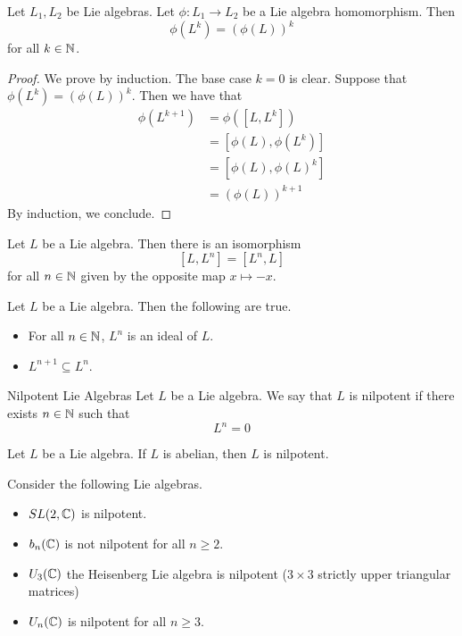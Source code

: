 \documentclass[a4paper]{article}
\begin{document}
\begin{lmm}{}{} Let $L_1,L_2$ be Lie algebras. Let $\phi:L_1\to L_2$ be a Lie algebra homomorphism. Then $$\phi(L^k)=(\phi(L))^k$$ for all $k\in\mathbb{N}$. \tcbline
\begin{proof}
We prove by induction. The base case $k=0$ is clear. Suppose that $\phi(L^k)=(\phi(L))^k$. Then we have that 
\begin{align*}
\phi(L^{k+1})&=\phi([L,L^k])\\
&=[\phi(L),\phi(L^k)]\\
&=[\phi(L),\phi(L)^k]\\
&=(\phi(L))^{k+1}
\end{align*}
By induction, we conclude. 
\end{proof}
\end{lmm}

\begin{lmm}{}{} Let $L$ be a Lie algebra. Then there is an isomorphism $$[L,L^n]=[L^n,L]$$ for all $n\in\mathbb{N}$ given by the opposite map $x\mapsto-x$. 
\end{lmm}

\begin{lmm}{}{} Let $L$ be a Lie algebra. Then the following are true. 
\begin{itemize}
\item For all $n\in\mathbb{N}$, $L^n$ is an ideal of $L$. 
\item $L^{n+1}\subseteq L^n$. 
\end{itemize}
\end{lmm}

\begin{defn}{Nilpotent Lie Algebras}{} Let $L$ be a Lie algebra. We say that $L$ is nilpotent if there exists $n\in\mathbb{N}$ such that $$L^n=0$$
\end{defn}

\begin{lmm}{}{} Let $L$ be a Lie algebra. If $L$ is abelian, then $L$ is nilpotent. 
\end{lmm}

\begin{eg}{}{} Consider the following Lie algebras. 
\begin{itemize}
\item $SL(2,\mathbb{C})$ is nilpotent. 
\item $b_n(\mathbb{C})$ is not nilpotent for all $n\geq 2$. 
\item $U_3(\mathbb{C})$ the Heisenberg Lie algebra is nilpotent ($3\times 3$ strictly upper triangular matrices)
\item $U_n(\mathbb{C})$ is nilpotent for all $n\geq 3$. 
\end{itemize}
\end{eg}
\end{document}
